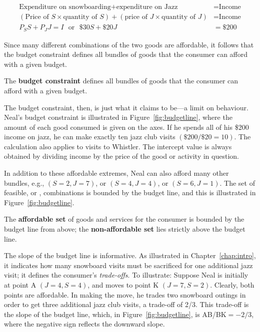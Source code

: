 \begin{align*}
	\mbox{Expenditure on snowboarding}+\mbox{expenditure on Jazz} &=\mbox{Income} \\
	(\mbox{Price of }S\times\mbox{quantity of }S)+(\mbox{price of }J\times\mbox{quantity of }J)&=\mbox{Income} \\
	P_{S}S+P_{J}J = I\mbox{~~or~~}\$30S+\$20J&=\$200
\end{align*}

Since many different combinations of the two goods are affordable, it
follows that the budget constraint defines all bundles of goods that the
consumer can afford with a given budget.

\begin{DefBox}
	The \textbf{budget constraint} defines all bundles of goods that the consumer can afford with a given budget.
\end{DefBox}

The budget constraint, then, is just what it claims to be---a limit on
behaviour. Neal's budget constraint is illustrated in Figure~\ref{fig:budgetline},
where the amount of each good consumed is given on the
axes. If he spends all of his \$200 income on jazz, he can make exactly ten
jazz club visits $(\$200/\$20 = 10)$. The calculation also applies to visits
to Whistler. The intercept value is always obtained by dividing income by
the price of the good or activity in question.

\newhtmlpage



In addition to these affordable extremes, Neal can also afford many other
bundles, e.g., $(S=2,J=7)$, or $(S=4,J=4)$, or $(S=6,J=1)$. The set of
feasible, or , combinations is bounded by the budget
line, and this is illustrated in Figure~\ref{fig:budgetline}.

\begin{DefBox}
	The \textbf{affordable set} of goods and services for the consumer is bounded by the budget line from above; the \textbf{non-affordable set} lies strictly above the budget line.
\end{DefBox}

\newhtmlpage

The slope of the budget line is informative. As illustrated in Chapter~\ref{chap:intro}, it
indicates how many snowboard visits must be sacrificed for one additional
jazz visit; it defines the consumer's \textit{trade-offs}. To illustrate:
Suppose Neal is initially at point A $(J=4,S=4)$, and moves to point K 
$(J=7,S=2)$. Clearly, both points are affordable. In making the move, he
trades two snowboard outings in order to get three additional jazz club
visits, a trade-off of 2/3. This trade-off is the slope of the budget line,
which, in Figure~\ref{fig:budgetline}, is AB/BK$=-2/3$, where the negative
sign reflects the downward slope.

